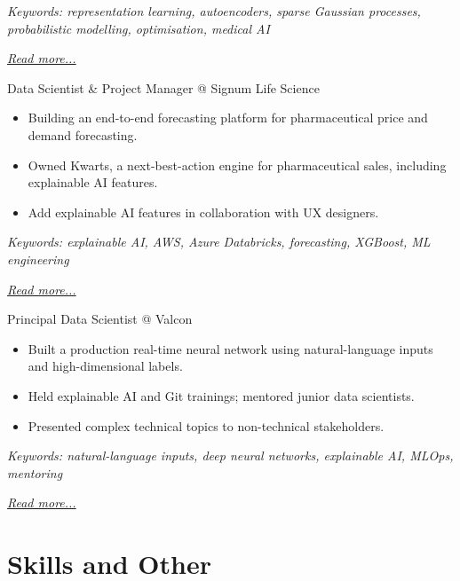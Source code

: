 \documentclass[11pt,a4paper]{moderncv}
\begin{document}
{\footnotesize\textit{Keywords: representation learning, autoencoders, sparse Gaussian processes, probabilistic modelling, optimisation, medical AI}}

\hfill{\small{\textit{\hyperref[sec:raysearch]{Read more...}}}}

\large{Data Scientist \& Project Manager @ Signum Life Science}
\normalsize
\begin{itemize}
    \item Building an end-to-end forecasting platform for pharmaceutical price and demand forecasting.
\item Owned Kwarts, a next-best-action engine for pharmaceutical sales, including explainable AI features.
\item Add explainable AI features in collaboration with UX designers.
\end{itemize}

{\footnotesize\textit{Keywords: explainable AI, AWS, Azure Databricks, forecasting, XGBoost, ML engineering}}

\hfill{\small{\textit{\hyperref[sec:signum]{Read more...}}}}

\large{Principal Data Scientist @ Valcon}
\normalsize
\begin{itemize}
    \item Built a production real-time neural network using natural-language inputs and high-dimensional labels.
    \item Held explainable AI and Git trainings; mentored junior data scientists.
    \item Presented complex technical topics to non-technical stakeholders.
\end{itemize}

{\footnotesize\textit{Keywords: natural-language inputs, deep neural networks, explainable AI, MLOps, mentoring}}

\hfill{\small{\textit{\hyperref[sec:valcon]{Read more...}}}}

\section{Skills and Other}
\normalsize
{}
\end{document}
